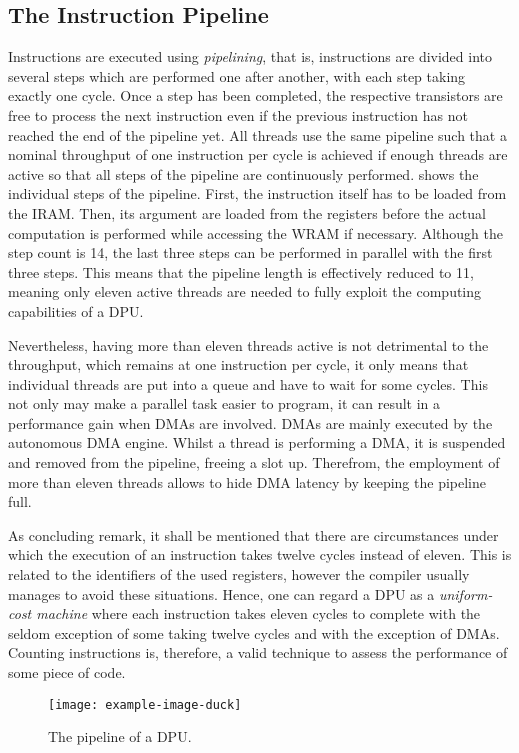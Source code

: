 \subsection{The Instruction Pipeline}
\label{sec:prereq:arch:pipeline}

Instructions are executed using \emph{pipelining}, that is, instructions are divided into several steps which are performed one after another, with each step taking exactly one cycle.
Once a step has been completed, the respective transistors are free to process the next instruction even if the previous instruction has not reached the end of the pipeline yet.
All threads use the same pipeline such that a nominal throughput of one instruction per cycle is achieved if enough threads are active so that all steps of the pipeline are continuously performed.
 shows the individual steps of the pipeline.
First, the instruction itself has to be loaded from the \ac{IRAM}.
Then, its argument are loaded from the registers before the actual computation is performed while accessing the \ac{WRAM} if necessary.
Although the step count is 14, the last three steps can be performed in parallel with the first three steps.
This means that the pipeline length is effectively reduced to 11, meaning only eleven active threads are needed to fully exploit the computing capabilities of a DPU.

Nevertheless, having more than eleven threads active is not detrimental to the throughput, which remains at one instruction per cycle, it only means that individual threads are put into a queue and have to wait for some cycles.
This not only may make a parallel task easier to program, it can result in a performance gain when \acp{DMA} are involved.
\Acp{DMA} are mainly executed by the autonomous \ac{DMA} engine.
Whilst a thread is performing a \ac{DMA}, it is suspended and removed from the pipeline, freeing a slot up.
Therefrom, the employment of more than eleven threads allows to hide \ac{DMA} latency by keeping the pipeline full.

As concluding remark, it shall be mentioned that there are circumstances under which the execution of an instruction takes twelve cycles instead of eleven.
This is related to the identifiers of the used registers, however the compiler usually manages to avoid these situations.
Hence, one can regard a \ac{DPU} as a \emph{uniform-cost machine} where each instruction takes eleven cycles to complete with the seldom exception of some taking twelve cycles and with the exception of \acp{DMA}.
Counting instructions is, therefore, a valid technique to assess the performance of some piece of code.

\begin{figure}
	\centering
	\texttt{[image: example-image-duck]}

	\caption{
		The pipeline of a \ac{DPU}.
	}
	\label{fig:arch:pipeline}
\end{figure}
